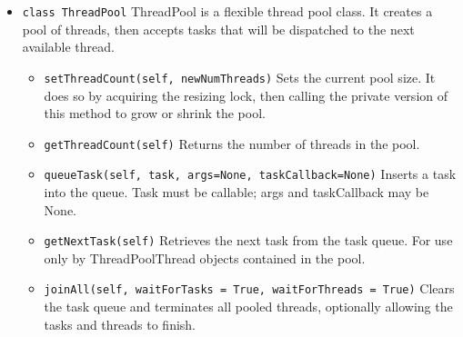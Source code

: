 \documentclass{article}
\begin{document}
\begin{flushleft}

\begin{itemize}
  \item{ \verb$class ThreadPool$ \linebreak
  ThreadPool is a flexible thread pool class. It creates a pool of threads, 
  then accepts tasks that will be dispatched to the next available thread.
  }
  \begin{itemize}
    \item{ \verb$setThreadCount(self, newNumThreads)$ \linebreak
    Sets the current pool size.  It does so by acquiring the resizing lock, 
    then calling the private version of this method to grow or shrink the pool.
    }
  \end{itemize}

  \begin{itemize}
    \item{ \verb$getThreadCount(self)$ \linebreak
    Returns the number of threads in the pool.
    }
  \end{itemize}

  \begin{itemize}
    \item{ \verb$queueTask(self, task, args=None, taskCallback=None)$ \linebreak
    Inserts a task into the queue. Task must be callable; 
    args and taskCallback may be None.
    }
  \end{itemize}

  \begin{itemize}
    \item{ \verb$getNextTask(self)$ \linebreak
    Retrieves the next task from the task queue.  For use only by ThreadPoolThread 
    objects contained in the pool.
    }
  \end{itemize}

  \begin{itemize}
    \item{ \verb$joinAll(self, waitForTasks = True, waitForThreads = True)$ \linebreak
    Clears the task queue and terminates all pooled threads,
    optionally allowing the tasks and threads to finish.
    }
  \end{itemize}

\end{itemize}


\end{flushleft}
\end{document}
